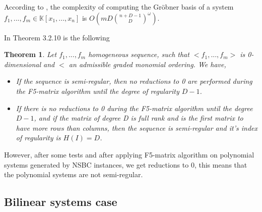 \documentclass[english]{article}
\newtheorem{theorem}{Theorem}[section]
\begin{document}
		According to \cite{BFS15}, the complexity of computing the Gröbner basis of a system $f_1,...,f_m \in \mathbb{K}[x_1,...,x_n]$ is $O(mD\binom{n+D-1}{D}^\omega)$.
		
		In \cite{Bardet04} Theorem 3.2.10 is the following
		
		\begin{theorem}
			Let $f_1,...,f_m$ homogeneous sequence, such that $<f_1,...,f_m>$ is 0-dimensional and
			$<$ an admissible graded monomial ordering. We have,
			\begin{itemize}
				\item[-] If the sequence is semi-regular, then no reductions to 0 are performed during the F5-matrix algorithm until the degree of regularity $D - 1$.
				\item[-] If there is no reductions to 0 during the F5-matrix algorithm until the degree $D - 1$, and if the matrix of degree D is full rank and is the first matrix to have more rows than columns, then the sequence is semi-regular and it's index of regularity is $H(I) = D$.
			\end{itemize}
		\end{theorem}
		
		However, after some tests and after applying F5-matrix algorithm on polynomial systems generated by NSBC instances, we get reductions to 0, this means that the polynomial systems are not semi-regular.
		
		\subsection{Bilinear systems case}
		
			
\printbibliography
\end{document}
